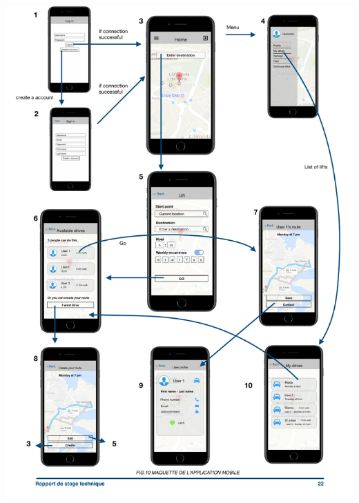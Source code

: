 \newpage
\begin{changemargin}{-2.5cm}{-2.5cm}{-3.8cm}
\includegraphics[page=1]{maquettes} 
\end{changemargin}